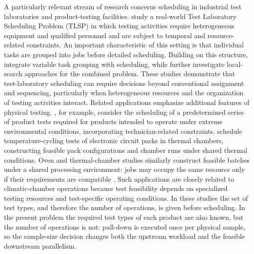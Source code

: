 \documentclass[11pt]{article}
\begin{document}
A particularly relevant stream of research concerns scheduling in industrial
test laboratories and product-testing facilities.
\citet{MischekMusliu2021} study a real-world Test Laboratory Scheduling
Problem (TLSP) in which testing activities require heterogeneous equipment
and qualified personnel and are subject to temporal and resource-related
constraints.
An important characteristic of this setting is that individual tasks are
grouped into jobs before detailed scheduling.
Building on this structure, \citet{DanzingerEtAl2020} integrate variable
task grouping with scheduling, while \citet{MischekMusliuSchaerf2023}
further investigate local-search approaches for the combined problem.
These studies demonstrate that test-laboratory scheduling can require
decisions beyond conventional assignment and sequencing, particularly when
heterogeneous resources and the organization of testing activities interact.
Related applications emphasize additional features of physical testing.
\citet{MartinEtAl2022}, for example, consider the scheduling of a
predetermined series of product tests required for products intended to
operate under extreme environmental conditions, incorporating
technician-related constraints.
\citet{LittleEtAl2006} schedule temperature-cycling tests of electronic
circuit packs in thermal chambers, constructing feasible pack configurations
and chamber runs under shared thermal conditions.
Oven and thermal-chamber studies similarly construct feasible batches under
a shared processing environment: jobs may occupy the same resource only if
their requirements are compatible
\citep{LacknerMrkvickaMusliuWalkiewiczWinter2023,MajumderLahaSuganthan2018}.
Such applications are closely related to climatic-chamber operations because
test feasibility depends on specialized testing resources and test-specific
operating conditions.
In these studies the set of test types, and therefore the number of
operations, is given before scheduling.
In the present problem the required test types of each product are also
known, but the number of operations is not: pull-down is executed once per
physical sample, so the sample-size decision changes both the upstream
workload and the feasible downstream parallelism.
\end{document}
